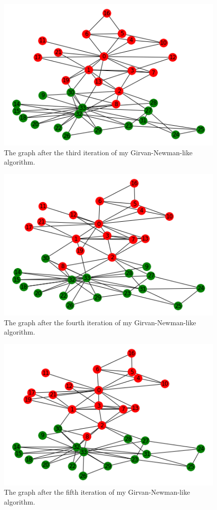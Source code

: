 \documentclass[12pt]{article}
\begin{document}
\begin{figure}[h]
    \centering
    \includegraphics{iteration3.png}
    \caption{The graph after the third iteration of my Girvan-Newman-like algorithm.}
    \label{fig:iteration3}
\end{figure}

\pagebreak

\begin{figure}[h]
    \centering
    \includegraphics{iteration4.png}
    \caption{The graph after the fourth iteration of my Girvan-Newman-like algorithm.}
    \label{fig:iteration4}
\end{figure}

\pagebreak

\begin{figure}[h]
    \centering
    \includegraphics{iteration5.png}
    \caption{The graph after the fifth iteration of my Girvan-Newman-like algorithm.}
    \label{fig:iteration5}
\end{figure}
\end{document}
